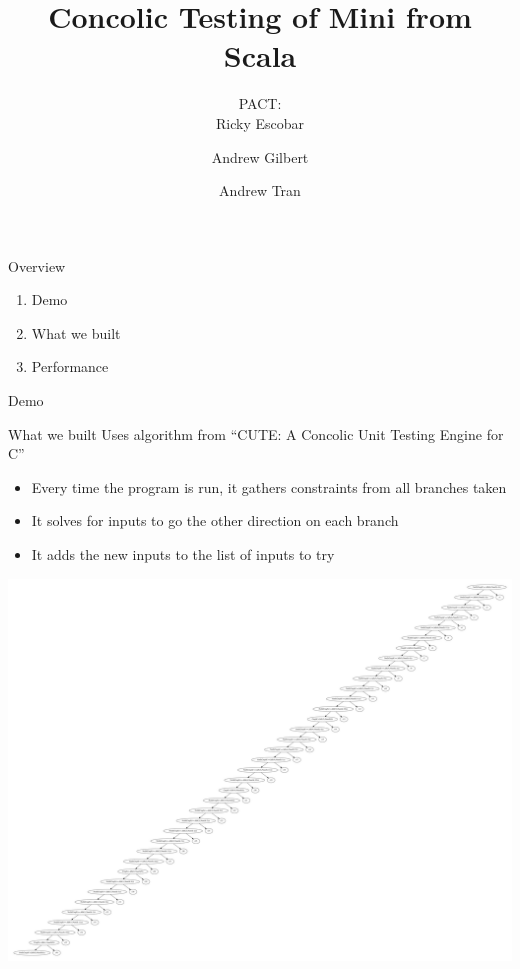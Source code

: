 \documentclass{beamer}
\title{Concolic Testing of Mini from Scala}
\author{PACT:\\  Ricky Escobar \and Andrew Gilbert \and Andrew Tran}
\begin{document}
\begin{frame}
  \maketitle
\end{frame}
\begin{frame}{Overview}
  \begin{enumerate}
    \item Demo
    \item What we built
    \item Performance
  \end{enumerate}
\end{frame}

\begin{frame}{Demo}
\end{frame}

\begin{frame}{What we built}
  Uses algorithm from ``CUTE: A Concolic Unit Testing Engine for C''
  \begin{itemize}
    \item<2-> Every time the program is run, it gathers constraints from all
      branches taken
    \item<3-> It solves for inputs to go the other direction on each branch
    \item<4-> It adds the new inputs to the list of inputs to try
  \end{itemize}
\end{frame}

\begin{frame}
  \includegraphics[height=\textheight,width=\textwidth,keepaspectratio]{iteration0}
\end{frame}
\end{document}
